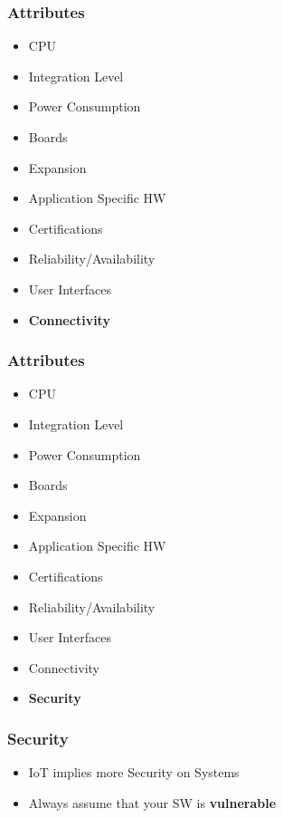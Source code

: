 \begin{frame}
  \frametitle{Attributes}
  \begin{itemize}
    \item CPU
    \item Integration Level
    \item Power Consumption
    \item Boards
    \item Expansion
    \item Application Specific HW
    \item Certifications
    \item Reliability/Availability
    \item User Interfaces
    \item {\bf Connectivity}
  \end{itemize}
\end{frame}


\begin{frame}
  \frametitle{Attributes}
  \begin{itemize}
    \item CPU
    \item Integration Level
    \item Power Consumption
    \item Boards
    \item Expansion
    \item Application Specific HW
    \item Certifications
    \item Reliability/Availability
    \item User Interfaces
    \item Connectivity
    \item {\bf Security}
  \end{itemize}
\end{frame}

\begin{frame}
  \frametitle{Security}
  \begin{itemize}
    \item IoT implies more Security on Systems
    \item Always assume that your SW is {\bf vulnerable}
  \end{itemize}
\end{frame}
